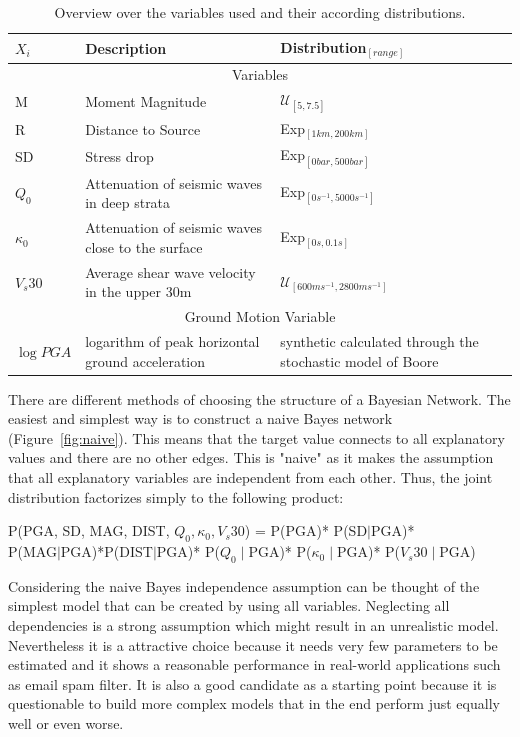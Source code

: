 \begin{table}[h]
\begin{tabular}{ p{3cm}p{5cm}p{5cm}  }
\hline
 $X_i$ & Description & Distribution$_{[range]}$\\
 \hline 
 \hline
 \multicolumn{3}{c}{Variables} \\
 \hline
 M   & Moment Magnitude    &$\mathcal{U}_{[5,7.5]}$\\
 R&   Distance to Source  & Exp$_{[1 km, 200km]}$\\
 SD & Stress drop & Exp$_{[0 bar, 500bar]}$\\
 $Q_0$    &Attenuation of seismic waves in deep strata &  Exp$_{[0 s^{-1}, 5000 s^{-1}]}$\\
 $\kappa_0$&   Attenuation of seismic waves close to the surface  &  Exp$_{[0 s, 0.1 s]}$\\
 $V_s30$& Average shear wave velocity in the upper 30m  & $\mathcal{U}_{[600 m s^{-1}, 2800 m s^{-1}]}$\\
 \hline
 \multicolumn{3}{c}{Ground Motion Variable} \\
 \hline
 $\log PGA$& logarithm of peak horizontal ground acceleration  & synthetic calculated through the stochastic model of Boore \citep{boore2003}\\
 \hline
\end{tabular}
\caption[Variables and distributions]{Overview over the variables used and their according distributions.}
\label{tab:1}
\end{table}

\newpage
There are different methods of choosing the structure of a Bayesian Network. The easiest and simplest way is to construct a naive Bayes network (Figure~\ref{fig:naive}). This means that the target value connects to all explanatory values and there are no other edges. This is "naive" as it makes the assumption that all explanatory variables are independent from each other. Thus, the joint distribution factorizes simply to the following product:
\begin{center}
\small
P(PGA, SD, MAG, DIST, $Q_0, \kappa_0, V_s30$) = P(PGA)* P(SD$\mid$PGA)* \\P(MAG$\mid$PGA)*P(DIST$\mid$PGA)* P($Q_0\mid$PGA)* P($\kappa_0\mid$PGA)* P($V_s30\mid$PGA)\\
\normalsize
\end{center}
Considering the naive Bayes independence assumption can be thought of the simplest model that can be created by using all variables. Neglecting all dependencies is a strong assumption which might result in an unrealistic model. Nevertheless it is a attractive choice because it needs very few parameters to be estimated and it shows a reasonable performance in real-world applications such as email spam filter. It is also a good candidate as a starting point because it is questionable to build more complex models that in the end perform just equally well or even worse.   

